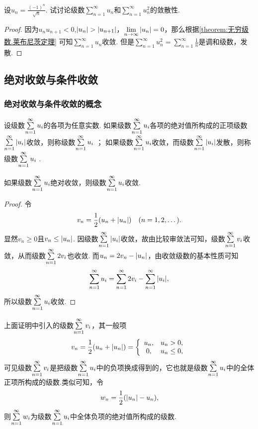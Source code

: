\begin{example}
\def\s{\sum\limits_{n=1}^\infty }%
\def\l{\lim\limits_{n\to\infty}}%
设\(u_n = \frac{(-1)^n}{\sqrt{n}}\).
试讨论级数\(\s u_n\)和\(\s u_n^2\)的敛散性.
\begin{proof}
因为\(u_n u_{n+1} < 0\),\(\abs{u_n} > \abs{u_{n+1}}\)，\(\l \abs{u_n} = 0\)，那么根据\cref{theorem:无穷级数.莱布尼茨定理} 可知\(\s u_n\)收敛.
但是\(\s u_n^2 = \s \frac{1}{n}\)是调和级数，发散.
\end{proof}
\end{example}

\subsection{绝对收敛与条件收敛}
\subsubsection{绝对收敛与条件收敛的概念}
\begin{definition}
设级数\(\s u_i\)的各项为任意实数.
如果级数\(\s u_i\)各项的绝对值所构成的正项级数\(\s {\abs{u_i}}\)收敛，则称级数\(\s u_i\) ；
如果级数\(\s u_i\)收敛，而级数\(\s {\abs{u_i}}\)发散，则称级数\(\s u_i\) .
\end{definition}

\begin{theorem}\label{theorem:无穷级数.绝对收敛级数必定收敛}
如果级数\(\s u_i\)绝对收敛，则级数\(\s u_i\)收敛.
\begin{proof}
令\[
v_n = \frac{1}{2} (u_n + \abs{u_n})
\quad(n=1,2,\dotsc).
\]显然\(v_n \geq 0\)且\(v_n \leq \abs{u_n}\).
因级数\(\s \abs{u_i}\)收敛，故由比较审敛法可知，级数\(\s v_i\)收敛，从而级数\(\s 2 v_i\)也收敛.
而\(u_n = 2 v_n - \abs{u_n}\)，由收敛级数的基本性质可知\[
\s u_i = \s 2 v_i - \s \abs{u_i},
\]所以级数\(\s u_i\)收敛.
\end{proof}
\end{theorem}

上面证明中引入的级数\(\s v_i\)，其一般项\[
v_n = \frac{1}{2} (u_n + \abs{u_n})
= \left\{ \begin{array}{cl}
u_n, & u_n > 0, \\
0, & u_n \leq 0,
\end{array} \right.
\]可见级数\(\s v_i\)是把级数\(\s u_i\)中的负项换成得到的，它也就是级数\(\s u_i\)中的全体正项所构成的级数.类似可知，令\[
w_n = \frac{1}{2} (\abs{u_n} - u_n),
\]则\(\s w_i\)为级数\(\s u_i\)中全体负项的绝对值所构成的级数.

